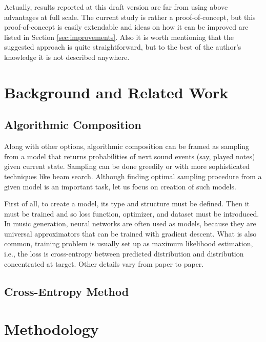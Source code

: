 \documentclass{article}
\begin{document}
Actually, results reported at this draft version are far from using above advantages at full scale. The current study is rather a proof-of-concept, but this proof-of-concept is easily extendable and ideas on how it can be improved are listed in Section \ref{sec:improvements}. Also it is worth mentioning that the suggested approach is quite straightforward, but to the best of the author's knowledge it is not described anywhere.


\section{Background and Related Work}
\label{sec:literature}

\subsection{Algorithmic Composition}
\label{subsec:composition}

Along with other options, algorithmic composition can be framed as sampling from a model that returns probabilities of next sound events (say, played notes) given current state. Sampling can be done greedily or with more sophisticated techniques like beam search. Although finding optimal sampling procedure from a given model is an important task, let us focus on creation of such models.

First of all, to create a model, its type and structure must be defined. Then it must be trained and so loss function, optimizer, and dataset must be introduced. In music generation, neural networks are often used as models, because they are universal approximators that can be trained with gradient descent. What is also common, training problem is usually set up as maximum likelihood estimation, i.e., the loss is cross-entropy between predicted distribution and distribution concentrated at target. Other details vary from paper to paper.

\subsection{Cross-Entropy Method}
\label{subsec:crossentropy}


\section{Methodology}
\label{sec:methodology}
\end{document}

